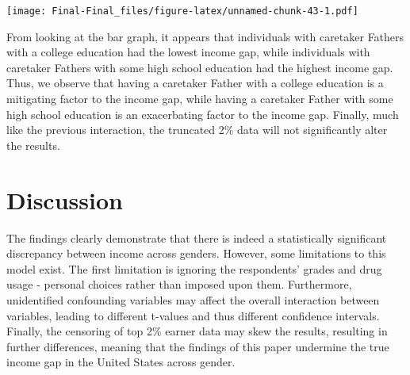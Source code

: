 \documentclass[
]{article}
\begin{document}
\texttt{[image: Final-Final\_files/figure-latex/unnamed-chunk-43-1.pdf]}

From looking at the bar graph, it appears that individuals with
caretaker Fathers with a college education had the lowest income gap,
while individuals with caretaker Fathers with some high school education
had the highest income gap. Thus, we observe that having a caretaker
Father with a college education is a mitigating factor to the income
gap, while having a caretaker Father with some high school education is
an exacerbating factor to the income gap. Finally, much like the
previous interaction, the truncated 2\% data will not significantly
alter the results.

\hypertarget{discussion}{%
\section{Discussion}\label{discussion}}

The findings clearly demonstrate that there is indeed a statistically
significant discrepancy between income across genders. However, some
limitations to this model exist. The first limitation is ignoring the
respondents' grades and drug usage - personal choices rather than
imposed upon them. Furthermore, unidentified confounding variables may
affect the overall interaction between variables, leading to different
t-values and thus different confidence intervals. Finally, the censoring
of top 2\% earner data may skew the results, resulting in further
differences, meaning that the findings of this paper undermine the true
income gap in the United States across gender.
\end{document}
